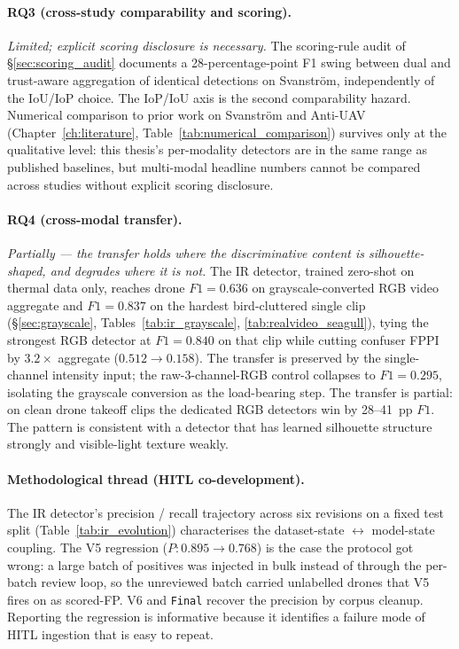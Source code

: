 \documentclass[12pt,a4paper,oneside,openright]{book}
\begin{document}
\paragraph{RQ3 (cross-study comparability and scoring).}
\emph{Limited; explicit scoring disclosure is necessary.} The scoring-rule audit of \S\ref{sec:scoring_audit} documents a 28-percentage-point F1 swing between dual and trust-aware aggregation of identical detections on Svanstr\"om, independently of the IoU/IoP choice. The IoP/IoU axis is the second comparability hazard. Numerical comparison to prior work on Svanstr\"om and Anti-UAV (Chapter~\ref{ch:literature}, Table~\ref{tab:numerical_comparison}) survives only at the qualitative level: this thesis's per-modality detectors are in the same range as published baselines, but multi-modal headline numbers cannot be compared across studies without explicit scoring disclosure.

\paragraph{RQ4 (cross-modal transfer).}
\emph{Partially --- the transfer holds where the discriminative content is silhouette-shaped, and degrades where it is not.} The IR detector, trained zero-shot on thermal data only, reaches drone $F1=0.636$ on grayscale-converted RGB video aggregate and $F1=0.837$ on the hardest bird-cluttered single clip (\S\ref{sec:grayscale}, Tables~\ref{tab:ir_grayscale}, \ref{tab:realvideo_seagull}), tying the strongest RGB detector at $F1=0.840$ on that clip while cutting confuser FPPI by $3.2\times$ aggregate ($0.512 \to 0.158$). The transfer is preserved by the single-channel intensity input; the raw-3-channel-RGB control collapses to $F1=0.295$, isolating the grayscale conversion as the load-bearing step. The transfer is partial: on clean drone takeoff clips the dedicated RGB detectors win by 28--41~pp $F1$. The pattern is consistent with a detector that has learned silhouette structure strongly and visible-light texture weakly.

\paragraph{Methodological thread (HITL co-development).}
The IR detector's precision / recall trajectory across six revisions on a fixed test split (Table~\ref{tab:ir_evolution}) characterises the dataset-state $\leftrightarrow$ model-state coupling. The V5 regression ($P: 0.895 \to 0.768$) is the case the protocol got wrong: a large batch of positives was injected in bulk instead of through the per-batch review loop, so the unreviewed batch carried unlabelled drones that V5 fires on as scored-FP. V6 and \texttt{Final} recover the precision by corpus cleanup. Reporting the regression is informative because it identifies a failure mode of HITL ingestion that is easy to repeat.
\end{document}
